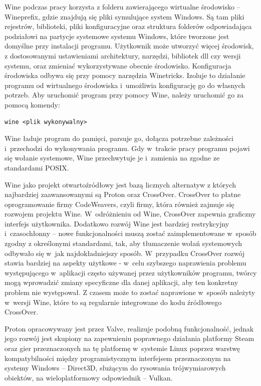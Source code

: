 Wine podczas pracy korzysta z folderu zawierającego wirtualne środowisko -- Wineprefix\cite{wineprefix}, gdzie znajdują się pliki symulujące system Windows. Są tam pliki rejestrów, biblioteki, pliki konfiguracyjne oraz struktura folderów odpowiadająca podziałowi na partycje systemowe systemu Windows, które tworzone jest domyślne przy instalacji programu. Użytkownik może utworzyć więcej środowisk, z dostosowanymi ustawieniami architektury, narzędzi, bibliotek dll czy wersji systemu, oraz zmieniać wykorzystywane obecnie środowisko. Konfiguracja środowiska odbywa się przy pomocy narzędzia Winetricks\cite{winetricks}. Izoluje to działanie programu od wirtualnego środowiska i~umożliwia konfigurację go do własnych potrzeb. Aby uruchomić program przy pomocy Wine, należy uruchomić go za pomocą komendy:
\begin{verbatim}
wine <plik wykonywalny>
\end{verbatim} Wine ładuje program do pamięci, parsuje go, dołącza potrzebne zależności i~przechodzi do wykonywania programu. Gdy w~trakcie pracy programu pojawi się wołanie systemowe, Wine przechwytuje je i~zamienia na zgodne ze standardami POSIX. 

Wine jako projekt otwartoźródłowy jest bazą licznych alternatyw\cite{wineBasedProjects} z których najbardziej zaawansowanymi są Proton\cite{proton} oraz CrossOver\cite{crossover}. CrossOver to płatne oprogramowanie firmy CodeWeavers, czyli firmy, która również zajmuje się rozwojem projektu Wine. W~odróżnieniu od Wine, CrossOver zapewnia graficzny interfejs użytkownika. Dodatkowo rozwój Wine jest bardziej restrykcyjny i~czasochłonny -- nowe funkcjonalności muszą zostać zaimplementowane w~sposób zgodny z określonymi standardami, tak, aby tłumaczenie wołań systemowych odbywało się w~jak najdokładniejszy sposób. W~przypadku CrossOver rozwój stawia bardziej na aspekty użytkowe - w~celu szybszego naprawienia problemu występującego w~aplikacji często używanej przez użytkowników programu, twórcy mogą wprowadzić zmiany specyficzne dla danej aplikacji, aby ten konkretny problem nie występował. Z czasem może to zostać naprawione w~sposób należyty w~wersji Wine, które to są regularnie integrowane do kodu źródłowego CrossOver.

Proton opracowywany jest przez Valve, realizuje podobną funkcjonalność, jednak jego rozwój jest skupiony na zapewnieniu poprawnego działania platformy Steam oraz gier przeznaczonych na tę platformę w~systemie Linux poprzez warstwę kompatybilności między programistycznym interfejsem przeznaczonym na systemy Windows -- Direct3D, służącym do rysowania trójwymiarowych obiektów, na wieloplatformowy odpowiednik -- Vulkan.

